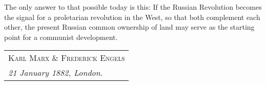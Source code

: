 The only answer to that possible today is this: If the Russian Revolution becomes the signal for a proletarian revolution in the West, so that both complement each other, the present Russian common ownership of land may serve as the starting point for a communist development. 

\hfill
\begin{tabular}{@{}l@{}}
\scshape Karl Marx \& Frederick Engels  \\
\emph{21 January 1882, London.}
\end{tabular}

